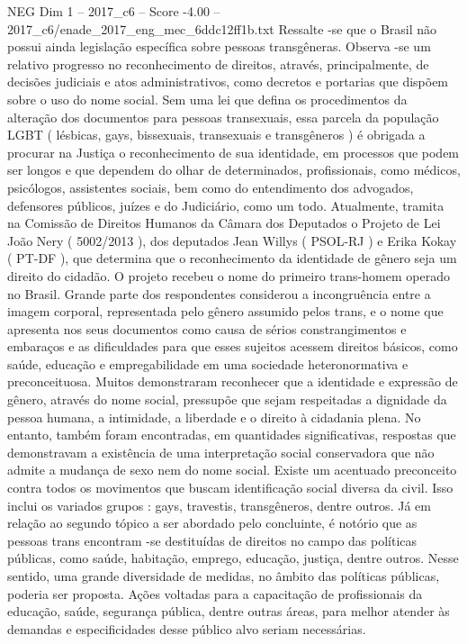 \begin{textsample}{NEG Dim 1 – 2017\_c6 – Score -4.00 – 2017\_c6/enade\_2017\_eng\_mec\_6ddc12ff1b.txt}
Ressalte -se que o Brasil não possui ainda legislação específica sobre pessoas transgêneras.
Observa -se um relativo progresso no reconhecimento de direitos, através, principalmente, de decisões judiciais e atos administrativos, como decretos e portarias que dispõem sobre o uso do nome social.
Sem uma lei que defina os procedimentos da alteração dos documentos para pessoas transexuais, essa parcela da população LGBT ( lésbicas, gays, bissexuais, transexuais e transgêneros ) é obrigada a procurar na Justiça o reconhecimento de sua identidade, em processos que podem ser longos e que dependem do olhar de determinados, profissionais, como médicos, psicólogos, assistentes sociais, bem como do entendimento dos advogados, defensores públicos, juízes e do Judiciário, como um todo.
Atualmente, tramita na Comissão de Direitos Humanos da Câmara dos Deputados o Projeto de Lei João Nery ( 5002/2013 ), dos deputados Jean Willys ( PSOL-RJ ) e Erika Kokay ( PT-DF ), que determina que o reconhecimento da identidade de gênero seja um direito do cidadão.
O projeto recebeu o nome do primeiro trans-homem operado no Brasil.
Grande parte dos respondentes considerou a incongruência entre a imagem corporal, representada pelo gênero assumido pelos trans, e o nome que apresenta nos seus documentos como causa de sérios constrangimentos e embaraços e as dificuldades para que esses sujeitos acessem direitos básicos, como saúde, educação e empregabilidade em uma sociedade heteronormativa e preconceituosa.
Muitos demonstraram reconhecer que a identidade e expressão de gênero, através do nome social, pressupõe que sejam respeitadas a dignidade da pessoa humana, a intimidade, a liberdade e o direito à cidadania plena.
No entanto, também foram encontradas, em quantidades significativas, respostas que demonstravam a existência de uma interpretação social conservadora que não admite a mudança de sexo nem do nome social.
Existe um acentuado preconceito contra todos os movimentos que buscam identificação social diversa da civil.
Isso inclui os variados grupos : gays, travestis, transgêneros, dentre outros.
Já em relação ao segundo tópico a ser abordado pelo concluinte, é notório que as pessoas trans encontram -se destituídas de direitos no campo das políticas públicas, como saúde, habitação, emprego, educação, justiça, dentre outros.
Nesse sentido, uma grande diversidade de medidas, no âmbito das políticas públicas, poderia ser proposta.
Ações voltadas para a capacitação de profissionais da educação, saúde, segurança pública, dentre outras áreas, para melhor atender às demandas e especificidades desse público alvo seriam necessárias.

\end{textsample}
